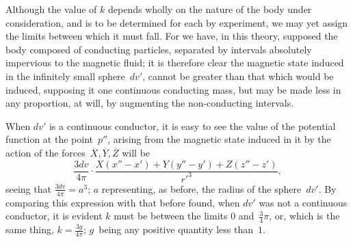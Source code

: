 \documentclass[12pt,notitlepage]{amsart}
\begin{document}
Although the value of $k$ depends wholly on the nature of the body
under consideration, and is to be determined for each by experiment, we may
yet assign the limits between which it must fall. For we have, in this theory,
supposed the body composed of conducting particles, separated by intervals
absolutely impervious to the magnetic fluid; it is therefore clear the magnetic
state induced in the infinitely small sphere~$dv'$, cannot be greater than that
which would be induced, supposing it one continuous conducting mass, but
may be made less in any proportion, at will, by augmenting the non-conducting
intervals.

When $dv'$ is a continuous conductor, it is easy to see the value of
the potential function at the point~$p''$,
arising from the magnetic state induced
in it by the action of the forces~$\overline{X},\overline{Y},\overline{Z}$
will be
\[
\frac{3dv}{4\pi}\cdot
\frac{X(x''-x')+Y(y''-y')+Z(z''-z')}{r'^3},
\]
seeing that $\frac{3dv}{4\pi}=a^3$;
$a$ representing, as before, the radius of the sphere~$dv'$.
By comparing this expression with that before found, when $dv'$ was not a
continuous conductor, it is evident $k$ must be between
the limits $0$ and~$\frac34\pi$,
or, which is the same thing, ${k=\frac{3g}{4\pi}}$;
$g$~being any positive quantity less than~$1$.
\end{document}
